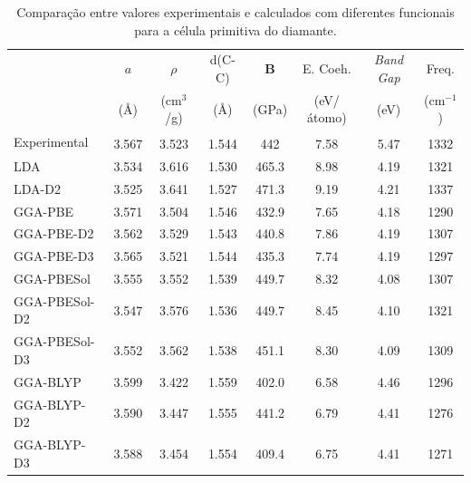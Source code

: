 		\begin{table}[]
			\centering
			\caption{Comparação entre valores experimentais e calculados com diferentes funcionais para a célula primitiva do diamante.}
			\label{dados_diamante}
			\renewcommand{\arraystretch}{1.2}
			\small\selectfont
			\begin{tabular}{l|ccccccc}
				\hline\hline
				& $a$ & $\rho$ & d(C-C) & \textbf{B} & E. Coeh. & \textit{Band Gap} & Freq. \\
				& (Å) & (cm$^3$/g) & (Å) & (GPa) & (eV/átomo) & (eV) & (cm$^{-1}$) \\ \hline
				Experimental & 3.567\textsuperscript{\cite{hom1975accurate}} & 3.523\textsuperscript{\cite{hom1975accurate}}     & 1.544\textsuperscript{\cite{hom1975accurate}}       & 442\textsuperscript{\cite{grimsditch1975brillouin}}     &  7.58\textsuperscript{\cite{greenwood2012chemistry}}     & 5.47\textsuperscript{\cite{greenwood2012chemistry}}     & 1332\textsuperscript{\cite{warren1967lattice}}         \\
				LDA          & 3.534 & 3.616     & 1.530        & 465.3   &  8.98     & 4.19     & 1321         \\
				LDA-D2       & 3.525 & 3.641     & 1.527        & 471.3   &  9.19     & 4.21     & 1337         \\
				GGA-PBE      & 3.571 & 3.504     & 1.546        & 432.9   &  7.65     & 4.18     & 1290         \\
				GGA-PBE-D2   & 3.562 & 3.529     & 1.543        & 440.8   &  7.86     & 4.19     & 1307         \\
				GGA-PBE-D3   & 3.565 & 3.521     & 1.544        & 435.3   &  7.74     & 4.19     & 1297         \\
				GGA-PBESol   & 3.555 & 3.552     & 1.539        & 449.7   &  8.32     & 4.08     & 1307         \\
				GGA-PBESol-D2& 3.547 & 3.576     & 1.536        & 449.7   &  8.45     & 4.10     & 1321         \\
				GGA-PBESol-D3& 3.552 & 3.562     & 1.538        & 451.1   &  8.30     & 4.09     & 1309         \\
				GGA-BLYP     & 3.599 & 3.422     & 1.559        & 402.0   &  6.58     & 4.46     & 1296         \\
				GGA-BLYP-D2  & 3.590 & 3.447     & 1.555        & 441.2   &  6.79     & 4.41     & 1276         \\
				GGA-BLYP-D3  & 3.588 & 3.454     & 1.554        & 409.4   &  6.75     & 4.41     & 1271         \\

\end{tabular}
\end{table}
